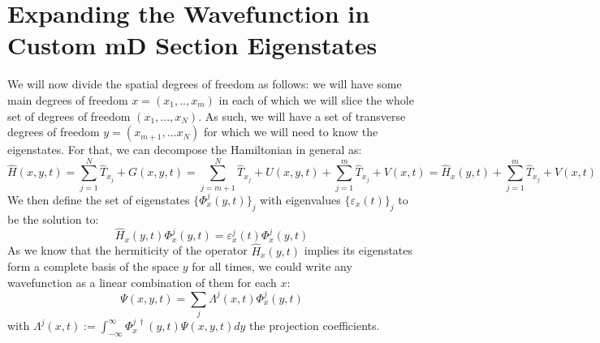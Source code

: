 \documentclass[11pt, a4paper]{article} %
\begin{document}
\section{Expanding the Wavefunction in Custom mD Section Eigenstates}
We will now divide the spatial degrees of freedom as follows: we will have some main degrees of freedom $x=(x_1,..,x_m)$ in each of which we will slice the whole set of degrees of freedom $(x_1,...,x_N)$. As such, we will have a set of transverse degrees of freedom $y=(x_{m+1},...x_N)$ for which we will need to know the eigenstates. For that, we can decompose the Hamiltonian in general as:
\begin{equation}
\hat{H}(x, y, t)= \sum_{j=1}^{N}\hat{T}_{x_j}+G(x, y, t)=\sum_{j=m+1}^{N}\hat{T}_{x_j}+U(x, y, t)+\sum_{j=1}^{m}\hat{T}_{x_j}+V(x,t) = \hat{H}_x(y,t)+\sum_{j=1}^{m}\hat{T}_{x_j}+V(x,t)
\end{equation}
We then define the set of eigenstates $\{\Phi^j_x(y,t)\}_j$ with eigenvalues $\{\varepsilon_x(t)\}_j$ to be the solution to:
\begin{equation}
\hat{H}_x(y,t)\Phi^j_x(y,t)=\varepsilon^j_x(t)\Phi^j_x(y,t)
\end{equation}
As we know that the hermiticity of the operator $\hat{H}_x(y,t)$ implies its eigenstates form a complete basis of the space $y$ for all times, we could write any wavefunction as a linear combination of them for each $x$:
\begin{equation}
\Psi(x,y,t)=\sum_j \Lambda^j(x,t) \Phi^j_x(y,t)
\end{equation}
with $\Lambda^j(x,t):= \int_{-\infty}^{\infty}\Phi^{j\ \dagger}_x(y,t) \Psi(x,y,t)dy$ the projection coefficients.
\end{document}
